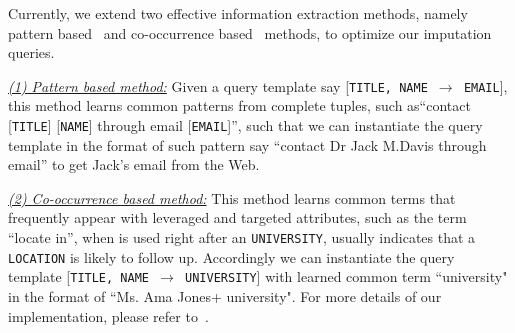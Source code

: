\documentclass[sigconf]{acmart}
\begin{document}




Currently, we extend two effective information extraction methods, namely pattern based~\cite{hearst1992automatic} and co-occurrence based~\cite{li2014core} methods, to optimize our imputation queries.

\noindent\underline{\it (1) Pattern based method:} Given a query template say [{\tt TITLE, NAME $\to$ EMAIL}], this method learns common patterns from complete tuples, such as``contact [{\tt TITLE}] [{\tt NAME}] through email [{\tt EMAIL}]'', such that we can instantiate the query template in the format of such pattern say ``contact Dr Jack M.Davis through email'' to get Jack's email from the Web.

\noindent\underline{\it (2) Co-occurrence based method:} This method learns common terms that frequently appear with leveraged and targeted attributes, such as the term ``locate in'', when is used right after an {\tt UNIVERSITY}, usually indicates that a {\tt LOCATION} is likely to follow up. Accordingly we can instantiate the query template [{\tt TITLE, NAME $\to$ UNIVERSITY}] with learned common term  ``university" in the format of ``Ms. Ama Jones+ university". For more details of our implementation, please refer to~\cite{li2012webput}.
\end{document}
